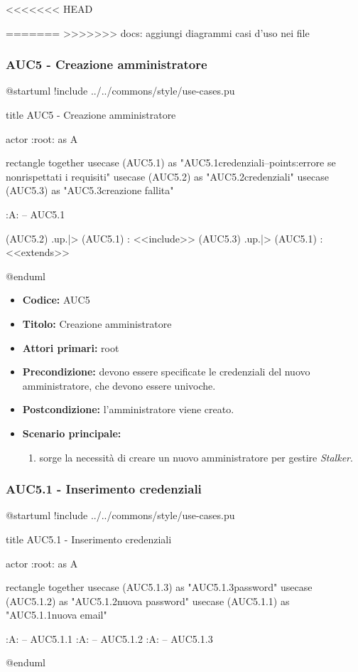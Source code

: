 \documentclass[casi-duso]{subfiles}
\begin{document}
<<<<<<< HEAD


=======
>>>>>>> docs: aggiungi diagrammi casi d'uso nei file
\subsubsection{AUC5 - Creazione amministratore}%
\label{subsub:AUC5}

\begin{plantuml}
@startuml
!include ../../commons/style/use-cases.pu

title AUC5 - Creazione amministratore

actor :root: as A

rectangle {
  together {
    usecase (AUC5.1) as "AUC5.1\nInserimento credenziali\n--\nExtension points:\nvisualizzazione errore se non\nvengono rispettati i requisiti"
    usecase (AUC5.2) as "AUC5.2\nVerifica credenziali"
    usecase (AUC5.3) as "AUC5.3\nVisualizza creazione fallita"
  }
}

:A: -- AUC5.1

(AUC5.2) .up.|> (AUC5.1) : <<include>>
(AUC5.3) .up.|> (AUC5.1) : <<extends>>

@enduml
\end{plantuml}

\begin{itemize}
  \item \textbf{Codice:} AUC5
  \item \textbf{Titolo:} Creazione amministratore
  \item \textbf{Attori primari:} root
  \item \textbf{Precondizione:} devono essere specificate le credenziali del nuovo amministratore, che devono essere univoche.
  \item \textbf{Postcondizione:} l'amministratore viene creato.
  \item \textbf{Scenario principale:}
  \begin{enumerate}
    \item sorge la necessità di creare un nuovo amministratore per gestire \emph{Stalker}.
  \end{enumerate}
\end{itemize}


\subsubsection{AUC5.1 - Inserimento credenziali}%
\label{subsub:AUC5.1}

\begin{plantuml}
@startuml
!include ../../commons/style/use-cases.pu

title AUC5.1 - Inserimento credenziali

actor :root: as A

rectangle {
  together {
    usecase (AUC5.1.3) as "AUC5.1.3\nConferma password"
    usecase (AUC5.1.2) as "AUC5.1.2\nInserimento nuova password"
    usecase (AUC5.1.1) as "AUC5.1.1\nInserimento nuova email"
  }
}

:A: -- AUC5.1.1
:A: -- AUC5.1.2
:A: -- AUC5.1.3

@enduml
\end{plantuml}
\end{document}
